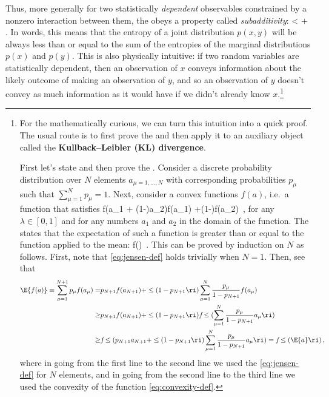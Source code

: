 Thus, more generally for two statistically \emph{dependent} observables 
constrained by
a nonzero interaction between them, the  
obeys a property called \emph{subadditivity}:
\be\label{eq:entropy-subadditivity}
\entropy\!\le[p(x,y)\ri] <  \entropy\!\le[p(x)\ri] +\entropy\!\le[p(y)\ri] \, .
\ee
In words, this means that the entropy of a joint distribution $p(x,y)$ will be always less than or equal to the sum of the entropies of the marginal distributions $p(x)$ and $p(y)$.
This is also physically intuitive: if two random variables are statistically dependent, then an observation of $x$ conveys information about the likely outcome of making an observation of $y$, and so an observation of $y$ doesn't convey as much information as it would have if we didn't already know $x$.\footnote{For the mathematically curious, we can turn this intuition into a quick proof. The usual route is to first prove the  and then apply it to an auxiliary object called the  \textbf{Kullback–Leibler (KL) divergence}.

First let's state and then prove the . Consider a discrete probability distribution over $N$ elements $a_{\mu=1,\ldots,N}$ 
with corresponding probabilities $p_\mu$
such that $\sum_{\mu=1}^{N} p_\mu=1$. Next, consider a convex functions $f(a)$, i.e.~a function that satisfies
\be\label{eq:convexity-def}
f\big(\lambda a_1 + (1-\lambda)a_2\big)\geq \lambda f(a_1) +(1-\lambda)f(a_2)\, ,
\ee 
for any $\lambda\in[0,1]$ and for any numbers $a_{1}$ and $a_2$ in the domain of the function.
The  states that the expectation of such a function is greater than or equal to the function applied to the mean:
\be\label{eq:jensen-def}
 \geq f\!\le(\ri) \,.
\ee
This can be proved by induction on $N$ as follows. First, note that \eqref{eq:jensen-def} holds trivially when $N=1$. Then, see that
\begin{align}
\E{f(a)} \equiv\sum_{\mu=1}^{N+1} p_{\mu} f(a_{\mu})=&p_{N+1} f(a_{N+1})+\le(1-p_{N+1} \ri)\sum_{\mu=1}^{N} \frac{p_{\mu}}{1-p_{N+1} } f(a_{\mu})\, \\
\geq&p_{N+1} f(a_{N+1}) +\le(1-p_{N+1} \ri) f\!\le(\sum_{\mu=1}^{N} \frac{p_{\mu}}{1-p_{N+1}}a_{\mu}\ri)\, \notag\\
\geq&f\!\le(p_{N+1}a_{N+1}+\le(1-p_{N+1}\ri)\sum_{\mu=1}^{N} \frac{p_{\mu}}{1-p_{N+1}}a_{\mu}\ri)=f\!\le(\E{a}\ri) \, ,\notag
\end{align}
where in going from the first line to the second line we used the  \eqref{eq:jensen-def} for $N$ elements, and in going from the second line to the third line we used the convexity of the function \eqref{eq:convexity-def}.




}
